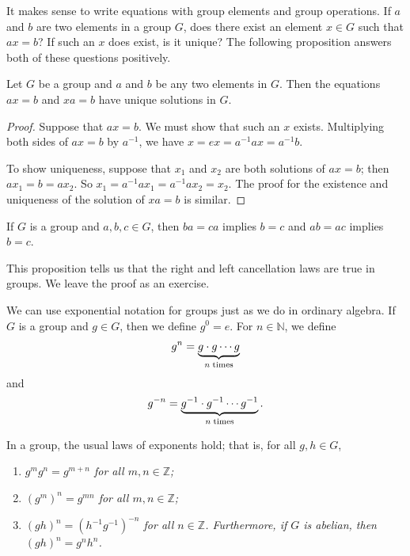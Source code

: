  
\medskip
 
 
It makes sense to write equations with group elements and group
operations. If $a$ and $b$ are two elements in a group $G$, does there 
exist an element $x \in G$ such that $ax = b$? If such an $x$ does
exist, is it unique? The following proposition answers both of these
questions positively. 
 
 
\begin{proposition}
Let $G$ be a group and $a$ and $b$ be any two elements in $G$. Then
the equations $ax = b$ and $xa = b$ have unique solutions in $G$. 
\end{proposition}
 
 
\begin{proof}
Suppose that $ax = b$. We must show that such an $x$ exists.
Multiplying both sides of $ax = b$ by $a^{-1}$, we have $x = ex =
a^{-1}ax = a^{-1}b$. 
 
 
To show uniqueness, suppose that $x_1$ and $x_2$ are both solutions of
$ax = b$; then $ax_1 = b = ax_2$. So $x_1 = a^{-1}ax_1 = a^{-1}ax_2 =
x_2$. The proof for the existence and uniqueness of the solution of
$xa = b$ is similar. 
\end{proof}
 

 
\begin{proposition}
If $G$ is a group and $a, b, c \in G$, then $ba = ca$ implies $b = c$
and $ab = ac$ implies $b = c$. 
\end{proposition} 
 
This proposition tells us that the {\bfi right and 
left cancellation laws\/} are true in groups.  We leave the proof as an exercise.
 
 
We can use exponential notation for groups just as we do in ordinary
algebra. If $G$ is a group and $g \in G$, then we define $g^0 = e$.
For $n \in {\mathbb N}$, we define 
$$
g^n = \underbrace{g \cdot g \cdots g}_{n \; {\rm times}}
$$
and
$$
g^{-n} = \underbrace{g^{-1} \cdot g^{-1} \cdots g^{-1}}_{n
\; {\rm times}}.
$$
 
 
\begin{theorem}
In a group, the usual laws of exponents hold; that is, for all $g, h
\in G$,
\begin{enumerate}
 
\rm \item \it
$g^mg^n = g^{m+n}$ for all $m, n \in {\mathbb Z}$; 
 
\rm \item \it
$(g^m)^n = g^{mn}$ for all $m, n \in {\mathbb Z}$; 
 
\rm \item \it
$(gh)^n = (h^{-1}g^{-1})^{-n}$ for all $n \in {\mathbb Z}$. Furthermore,
if $G$ is abelian, then $(gh)^n = g^nh^n$. 
 
\end{enumerate}
\end{theorem}
 
